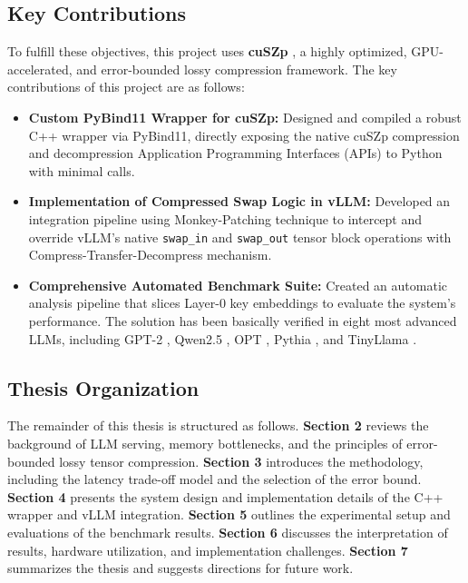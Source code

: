 \documentclass{polyu-comp}
\begin{document}
\subsection{Key Contributions}
To fulfill these objectives, this project uses \textbf{cuSZp} \cite{huang2023cuszp}, a highly optimized, GPU-accelerated, and error-bounded lossy compression framework. The key contributions of this project are as follows:
\begin{itemize}
    \item \textbf{Custom PyBind11 \cite{RODRIGUEZ_LUZARDO_2022} Wrapper for cuSZp:} Designed and compiled a robust C++ wrapper via PyBind11, directly exposing the native cuSZp compression and decompression Application Programming Interfaces (APIs) to Python with minimal calls.
    \item \textbf{Implementation of Compressed Swap Logic in vLLM:} Developed an integration pipeline using Monkey-Patching \cite{Hunt2023} technique to intercept and override vLLM's native \texttt{swap\_in} and \texttt{swap\_out} tensor block operations with Compress-Transfer-Decompress mechanism.
    \item \textbf{Comprehensive Automated Benchmark Suite:} Created an automatic analysis pipeline that slices Layer-0 \cite{zhang-etal-2024-investigating} key embeddings to evaluate the system's performance. The solution has been basically verified in eight most advanced LLMs, including GPT-2 \cite{radford2019language}, Qwen2.5 \cite{qwen2.5}, OPT \cite{zhang2022optopenpretrainedtransformer}, Pythia \cite{biderman2023pythia}, and TinyLlama \cite{zhang2024tinyllama}.
\end{itemize}

\subsection{Thesis Organization}
The remainder of this thesis is structured as follows. \textbf{Section 2} reviews the background of LLM serving, memory bottlenecks, and the principles of error-bounded lossy tensor compression. \textbf{Section 3} introduces the methodology, including the latency trade-off model and the selection of the error bound. \textbf{Section 4} presents the system design and implementation details of the C++ wrapper and vLLM integration. \textbf{Section 5} outlines the experimental setup and evaluations of the benchmark results. \textbf{Section 6} discusses the interpretation of results, hardware utilization, and implementation challenges. \textbf{Section 7} summarizes the thesis and suggests directions for future work.
\end{document}

